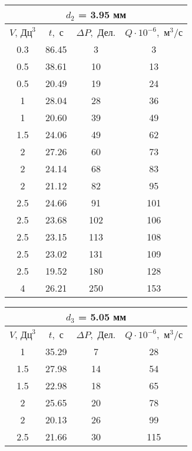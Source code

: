 \documentclass[a4paper, 12pt]{article}
\begin{document}
	\begin{table}[h]
		\bgroup
		\def\arraystretch{1.0}%
		\centering
		\begin{minipage}{.49\linewidth}
			\centering
			\begin{tabular}{|c|c|c|c|}
				\hline
				\multicolumn{4}{|c|}{$d_2$ = 3.95 мм }\\ \hline
				$V$, $\text{Дц}^3$& $t,$ с&$\Delta P,$ Дел.  & $Q\cdot 10^{-6},$ $\text{м}^3$/с\\ \hline
				0.3 & 86.45 & 3 & 3 \\ \hline
				0.5 & 38.61 & 10 & 13 \\ \hline
				0.5 & 20.49 & 19 & 24 \\ \hline
				1 & 28.04 & 28 & 36 \\ \hline
				1 & 20.60 & 39 & 49 \\ \hline
				1.5 & 24.06 & 49 & 62 \\ \hline
				2 & 27.26 & 60 & 73 \\ \hline \hline
				2 & 24.14 & 68 & 83 \\ \hline
				2 & 21.12 & 82 & 95 \\ \hline
				2.5 & 24.66 & 91 & 101 \\ \hline
				2.5 & 23.68 & 102 & 106 \\ \hline
				2.5 & 23.15 & 113 & 108 \\ \hline
				2.5 & 23.02 & 131 & 109 \\ \hline
				2.5 & 19.52 & 180 & 128 \\ \hline
				4 & 26.21 & 250 & 153 \\ \hline
			\end{tabular}
		\end{minipage}
		\begin{minipage}{.49\linewidth}
			\centering
			\begin{tabular}{|c|c|c|c|}
				\hline
				\multicolumn{4}{|c|}{$d_3$ = 5.05 мм }\\ \hline
				$V$, $\text{Дц}^3$& $t,$ с&$\Delta P,$ Дел.  & $Q\cdot 10^{-6},$ $\text{м}^3$/с\\ \hline
				1 & 35.29 & 7 & 28 \\ \hline
				1.5 & 27.98 & 14 & 54 \\ \hline
				1.5 & 22.98 & 18 & 65 \\ \hline
				2 & 25.65 & 20 & 78 \\ \hline
				2 & 20.13 & 26 & 99 \\ \hline
				2.5 & 21.66 & 30 & 115 \\ \hline

\end{tabular}
\end{minipage}
\end{table}
\end{document}
